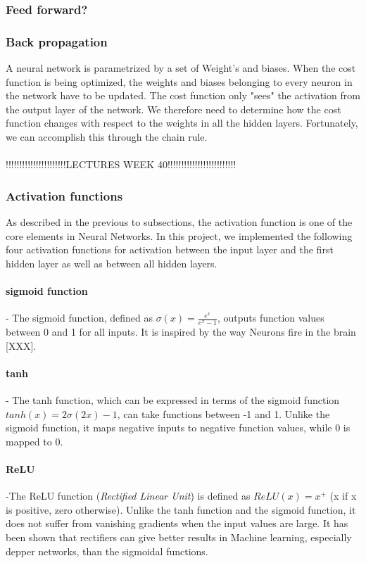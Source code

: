 \documentclass[11pt,a4paper,titlepage]{article}
\begin{document}
\subsubsection{Feed forward?}
\subsubsection{Back propagation}
A neural network is parametrized by a set of Weight's and biases. When the cost function is being optimized, the weights and biases belonging to every neuron in the network have to be updated. The cost function only "sees" the activation from the output layer of the network. We therefore need to determine how the cost function changes with respect to the weights in all the hidden layers. Fortunately, we can accomplish this through the chain rule.\\\\ !!!!!!!!!!!!!!!!!!!!!!LECTURES WEEK 40!!!!!!!!!!!!!!!!!!!!!!!!!
\subsubsection{Activation functions}
As described in the previous to subsections, the activation function is one of the core elements in Neural Networks. In this project, we implemented the following four activation functions for activation between the input layer and the first hidden layer as well as between all hidden layers. 
\paragraph*{sigmoid function} - The sigmoid function, defined as $\sigma(x)=\frac{e^x}{e^x-1}$, outputs function values between 0 and 1 for all inputs. It is inspired by the way Neurons fire in the brain [XXX].
\paragraph*{tanh} - The tanh function, which can be expressed in terms of the sigmoid function $tanh(x)=2\sigma(2x)-1$, can take functions between -1 and 1. Unlike the sigmoid function, it maps negative inputs to negative function values, while 0 is mapped to 0.
\paragraph*{ReLU} -The ReLU function (\textit{Rectified Linear Unit}) is defined as $ReLU(x)=x^+$ (x if x is positive, zero otherwise). Unlike the tanh function and the sigmoid function, it does not suffer from vanishing gradients when the input values are large. It has been shown \citep{surpremeRELU} that rectifiers can give better results in Machine learning, especially depper networks, than the sigmoidal functions.
\end{document}
